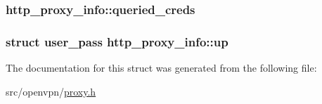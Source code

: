 \subsubsection[{queried\+\_\+creds}]{ http\+\_\+proxy\+\_\+info\+::queried\+\_\+creds}\label{structhttp__proxy__info_ae7c8574af511f9ccd61159a2efdebae5}
\hypertarget{structhttp__proxy__info_a20a26493c51f97b4cc6f4ac687fca016}{}
\subsubsection[{up}]{\setlength{\rightskip}{0pt plus 5cm}struct {\bf user\+\_\+pass} http\+\_\+proxy\+\_\+info\+::up}\label{structhttp__proxy__info_a20a26493c51f97b4cc6f4ac687fca016}


The documentation for this struct was generated from the following file\+:\begin{DoxyCompactItemize}
\item 
src/openvpn/\hyperlink{proxy_8h}{proxy.\+h}\end{DoxyCompactItemize}
